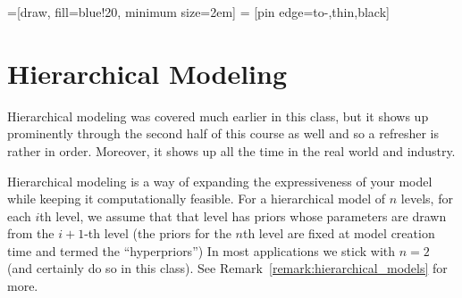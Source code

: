 \documentclass{article}
\begin{document}
=[draw, fill=blue!20, minimum size=2em]
 = [pin edge={to-,thin,black}]

\tableofcontents

\section{Hierarchical Modeling}

Hierarchical modeling was covered much earlier in this class, but it shows up
prominently through the second half of this course as well and so a refresher
is rather in order.
Moreover, it shows up all the time in the real world and industry.

Hierarchical modeling is a way of expanding the expressiveness of your model while keeping it computationally feasible.
For a hierarchical model of $n$ levels, for each $i$th level, we assume that that level has priors whose parameters are drawn from the $i + 1$-th level (the priors for the $n$th level are fixed at model creation time and termed the ``hyperpriors'')
In most applications we stick with $n = 2$ (and certainly do so in this class).
See Remark~\ref{remark:hierarchical_models} for more.
\end{document}
